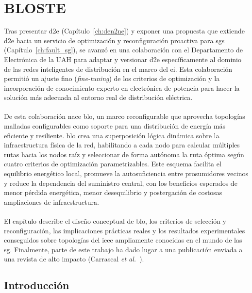 \chapter{BLOSTE}
\label{ch:bloste}

Tras presentar \gls{d2e} (Capítulo~\ref{ch:den2ne}) y exponer una propuesta que extiende \gls{d2e} hacia un servicio de optimización y reconfiguración proactiva para \glspl{sg} (Capítulo~\ref{ch:fault_sg}), se avanzó en una colaboración con el Departamento de Electrónica de la UAH para adaptar y versionar \gls{d2e} específicamente al dominio de las redes inteligentes de distribución en el marco del \gls{ei}. Esta colaboración permitió un ajuste fino (\textit{fine-tuning}) de los criterios de optimización y la incorporación de conocimiento experto en electrónica de potencia para hacer la solución más adecuada al entorno real de distribución eléctrica.\\
\\
De esta colaboración nace \gls{blo}, un marco reconfigurable que aprovecha topologías malladas configurables como soporte para una distribución de energía más eficiente y resiliente. \gls{blo} crea una superposición lógica dinámica sobre la infraestructura física de la red, habilitando a cada nodo para calcular múltiples rutas hacia los nodos raíz y seleccionar de forma autónoma la ruta óptima según cuatro criterios de optimización parametrizables. Este esquema facilita el equilibrio energético local, promueve la autosuficiencia entre prosumidores vecinos y reduce la dependencia del suministro central, con los beneficios esperados de menor pérdida energética, menor desequilibrio y postergación de costosas ampliaciones de infraestructura.\\
\\
El capítulo describe el diseño conceptual de \gls{blo}, los criterios de selección y reconfiguración, las implicaciones prácticas reales y los resultados experimentales conseguidos sobre topologías del \gls{ieee} ampliamente conocidas en el mundo de las \gls{sg}. Finalmente, parte de este trabajo ha dado lugar a una publicación enviada a una revista de alto impacto (Carrascal \textit{et al.}~\cite{carrascal2025dynamic}).

\section{Introducción}

